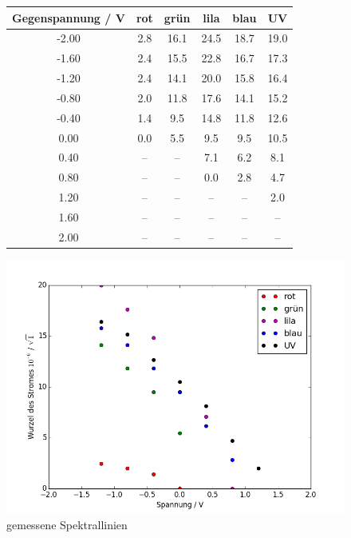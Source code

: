 \begin{figure}[h!]
	\centering
	\begin{tabular}{c|ccccc}
		Gegenspannung / V & rot & grün & lila & blau & UV \\
		\hline
	-2.00 & 2.8 & 16.1 & 24.5 & 18.7 & 19.0 \\
	-1.60 & 2.4 & 15.5 & 22.8 & 16.7 & 17.3 \\
	-1.20 & 2.4 & 14.1 & 20.0 & 15.8 & 16.4 \\
	-0.80 & 2.0 & 11.8 & 17.6 & 14.1 & 15.2 \\
	-0.40 & 1.4 & 9.5  & 14.8 & 11.8 & 12.6 \\
	0.00  & 0.0 & 5.5  & 9.5  & 9.5  & 10.5 \\
	0.40  & -- & --  & 7.1  & 6.2  & 8.1  \\
	0.80  & -- & -- & 0.0  & 2.8  & 4.7  \\
	1.20  & -- & --  & --  & --  & 2.0  \\
	1.60  & -- & --  & --  & --  & --  \\
	2.00  & -- & --  & -- & --  & --  \\
	\end{tabular}
	\label{tab:messdaten2}
\end{figure}

\begin{figure}[h!]
	\centering
	\includegraphics[width=\textwidth]{build/AlleWellenlangen.png}
	\caption{gemessene Spektrallinien}
	\label{fig:spektrallinien}
\end{figure}

